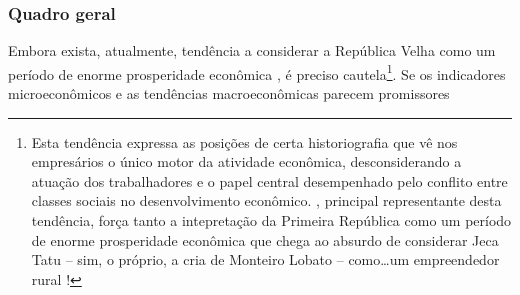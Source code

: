 \subsubsection{Quadro geral}\label{subsubsec:quager}

Embora exista, atualmente, tendência a considerar a República Velha como um período de enorme prosperidade econômica \cite{caldeira_riqueza_2017}, é preciso cautela\footnote{Esta tendência expressa as posições de certa historiografia que vê nos empresários o único motor da atividade econômica, desconsiderando a atuação dos trabalhadores e o papel central desempenhado pelo conflito entre classes sociais no desenvolvimento econômico. , principal representante desta tendência, força tanto a intepretação da Primeira República como um período de enorme prosperidade econômica que chega ao absurdo de considerar Jeca Tatu -- sim, o próprio, a cria de Monteiro Lobato -- como\dots um empreendedor rural \cite[pp.~517-518]{caldeira_riqueza_2017}!}. Se os indicadores microeconômicos e as tendências macroeconômicas parecem promissores 

